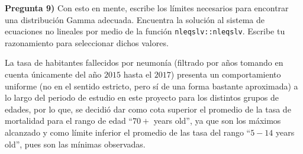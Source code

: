\documentclass[
]{article}
\begin{document}
\textbf{Pregunta 9)} Con esto en mente, escribe los límites necesarios
para encontrar una distribución Gamma adecuada. Encuentra la solución al
sistema de ecuaciones no lineales por medio de la función
\texttt{nleqslv::nleqslv}. Escribe tu razonamiento para seleccionar
dichos valores.

La tasa de habitantes fallecidos por neumonía (filtrado por años tomando
en cuenta únicamente del año \(2015\) hasta el \(2017\)) presenta un
comportamiento uniforme (no en el sentido estricto, pero sí de una forma
bastante aproximada) a lo largo del periodo de estudio en este proyecto
para los distintos grupos de edades, por lo que, se decidió dar como
cota superior el promedio de la tasa de mortalidad para el rango de edad
``\(70+\) years old'', ya que son los máximos alcanzado y como límite
inferior el promedio de las tasa del rango ``\(5-14\) years old'', pues
son las mínimas observadas.
\end{document}
